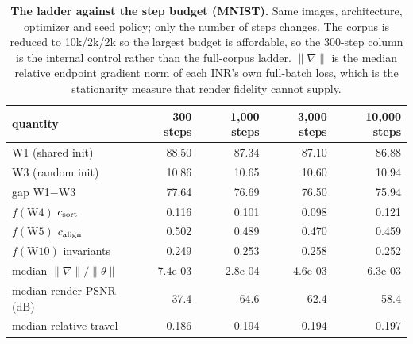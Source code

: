 \begin{table}[t]
\centering\small
\caption{\textbf{The ladder against the step budget (MNIST).} Same images, architecture, optimizer and seed policy; only the number of steps changes. The corpus is reduced to 10k/2k/2k so the largest budget is affordable, so the 300-step column is the internal control rather than the full-corpus ladder. $\|\nabla\|$ is the median relative endpoint gradient norm of each INR's own full-batch loss, which is the stationarity measure that render fidelity cannot supply.}
\label{tab:sweep}
\begin{tabular}{@{}lrrrr@{}}
\toprule
quantity & 300 steps & 1,000 steps & 3,000 steps & 10,000 steps \\
\midrule
W1 (shared init) & 88.50 & 87.34 & 87.10 & 86.88 \\
W3 (random init) & 10.86 & 10.65 & 10.60 & 10.94 \\
gap W1$-$W3 & 77.64 & 76.69 & 76.50 & 75.94 \\
\midrule
$f(\mathrm{W4})$ $c_{\mathrm{sort}}$ & 0.116 & 0.101 & 0.098 & 0.121 \\
$f(\mathrm{W5})$ $c_{\mathrm{align}}$ & 0.502 & 0.489 & 0.470 & 0.459 \\
$f(\mathrm{W10})$ invariants & 0.249 & 0.253 & 0.258 & 0.252 \\
\midrule
median $\|\nabla\|/\|\theta\|$ & 7.4e-03 & 2.8e-04 & 4.6e-03 & 6.3e-03 \\
median render PSNR (dB) & 37.4 & 64.6 & 62.4 & 58.4 \\
median relative travel & 0.186 & 0.194 & 0.194 & 0.197 \\
\bottomrule
\end{tabular}
\end{table}
